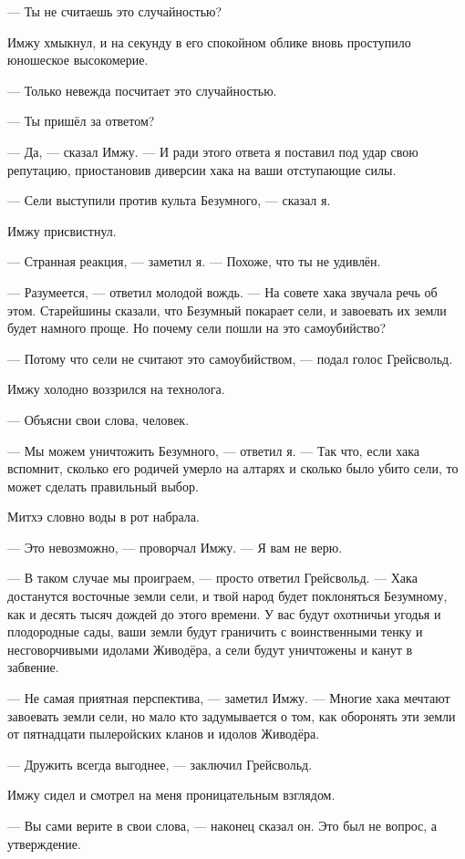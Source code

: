 --- Ты не считаешь это случайностью?

Имжу хмыкнул, и на секунду в его спокойном облике вновь проступило юношеское высокомерие.

--- Только невежда посчитает это случайностью.

--- Ты пришёл за ответом?

--- Да, --- сказал Имжу.
--- И ради этого ответа я поставил под удар свою репутацию, приостановив диверсии хака на ваши отступающие силы.

--- Сели выступили против культа Безумного, --- сказал я.

Имжу присвистнул.

--- Странная реакция, --- заметил я.
--- Похоже, что ты не удивлён.

--- Разумеется, --- ответил молодой вождь.
--- На совете хака звучала речь об этом.
Старейшины сказали, что Безумный покарает сели, и завоевать их земли будет намного проще.
Но почему сели пошли на это самоубийство?

--- Потому что сели не считают это самоубийством, --- подал голос Грейсвольд.

Имжу холодно воззрился на технолога.

--- Объясни свои слова, человек.

--- Мы можем уничтожить Безумного, --- ответил я.
--- Так что, если хака вспомнит, сколько его родичей умерло на алтарях и сколько было убито сели, то может сделать правильный выбор.

Митхэ словно воды в рот набрала.

--- Это невозможно, --- проворчал Имжу.
--- Я вам не верю.

--- В таком случае мы проиграем, --- просто ответил Грейсвольд.
--- Хака достанутся восточные земли сели, и твой народ будет поклоняться Безумному, как и десять тысяч дождей до этого времени.
У вас будут охотничьи угодья и плодородные сады, ваши земли будут граничить с воинственными тенку и несговорчивыми идолами Живодёра, а сели будут уничтожены и канут в забвение.

--- Не самая приятная перспектива, --- заметил Имжу.
--- Многие хака мечтают завоевать земли сели, но мало кто задумывается о том, как оборонять эти земли от пятнадцати пылеройских кланов и идолов Живодёра.

--- Дружить всегда выгоднее, --- заключил Грейсвольд.

Имжу сидел и смотрел на меня проницательным взглядом.

--- Вы сами верите в свои слова, --- наконец сказал он.
Это был не вопрос, а утверждение.

